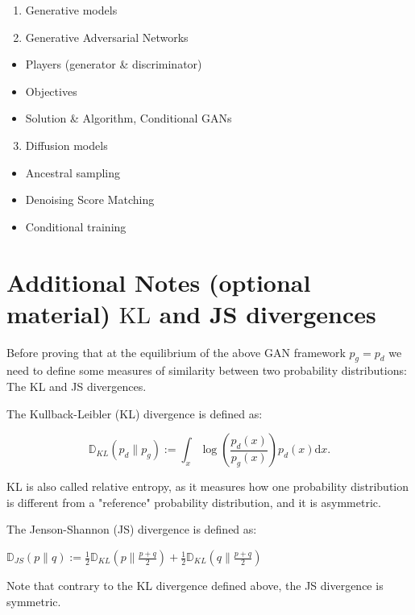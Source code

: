 \documentclass[10pt]{article}
\begin{document}
\begin{enumerate}
  \item Generative models

  \item Generative Adversarial Networks

\end{enumerate}

\begin{itemize}
  \item Players (generator \& discriminator)
  \item Objectives
  \item Solution \& Algorithm, Conditional GANs
\end{itemize}

\begin{enumerate}
  \setcounter{enumi}{2}
  \item Diffusion models
\end{enumerate}

\begin{itemize}
  \item Ancestral sampling
  \item Denoising Score Matching
  \item Conditional training
\end{itemize}

\section*{Additional Notes (optional material) 
 $\mathrm{KL}$ and JS divergences}
Before proving that at the equilibrium of the above GAN framework $p_{g}=p_{d}$ we need to define some measures of similarity between two probability distributions: The KL and JS divergences.

The Kullback-Leibler (KL) divergence is defined as:

$$
\mathbb{D}_{K L}\left(p_{d} \| p_{g}\right):=\int_{x} \log \left(\frac{p_{d}(x)}{p_{g}(x)}\right) p_{d}(x) \mathrm{d} x .
$$

KL is also called relative entropy, as it measures how one probability distribution is different from a "reference" probability distribution, and it is asymmetric.

The Jenson-Shannon (JS) divergence is defined as:

$\mathbb{D}_{J S}(p \| q):=\frac{1}{2} \mathbb{D}_{K L}\left(p \| \frac{p+q}{2}\right)+\frac{1}{2} \mathbb{D}_{K L}\left(q \| \frac{p+q}{2}\right)$

Note that contrary to the KL divergence defined above, the JS divergence is symmetric.
\end{document}
